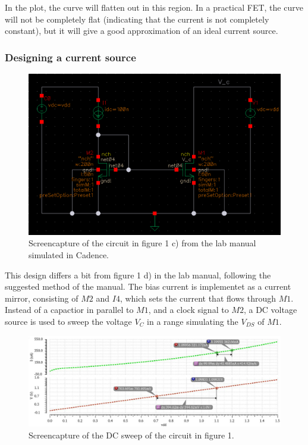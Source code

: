 \documentclass[onecolumn]{article}
\begin{document}
In the plot, the curve will flatten out in this region. In a practical FET, the curve will not be completely flat (indicating that the current is not completely constant), but it will give a good approximation of an ideal current source.

 \clearpage

\subsubsection*{Designing a current source}

\begin{figure}[h!]
    \centering
    \includegraphics[width=1\textwidth]{circuit_c_fixed.png}
    \caption{Screencapture of the circuit in figure 1 c) from the lab manual simulated in Cadence.}
    \label{fig:circuitc}
\end{figure}

This design differs a bit from figure 1 d) in the lab manual, following the suggested method of the manual. The bias current is implementet as a current mirror, consisting of $M2$ and $I4$, which sets the current that flows through $M1$. Instead of a capactior in parallel to $M1$, and a clock signal to $M2$, a DC voltage source is used to sweep the voltage $V_C$ in a range simulating the $V_{DS}$ of $M1$. 

\clearpage 

\begin{figure}[h!]
    \centering
    \includegraphics[width=1\textwidth]{plot_circuit_c_FINAL.png}
    \caption{Screencapture of the DC sweep of the circuit in figure 1.}
    \label{fig:plotc}
\end{figure}
\end{document}
